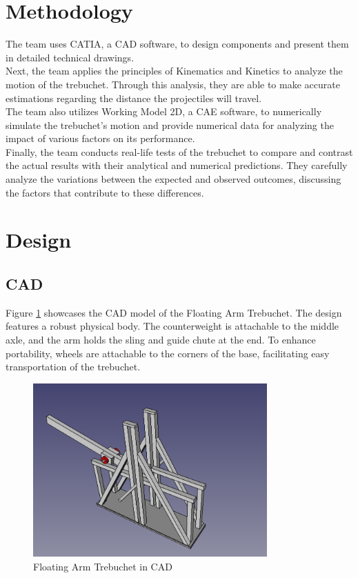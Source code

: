 \documentclass[12pt, titlepage]{article}
\begin{document}
    \section{Methodology}
    The team uses CATIA, a CAD software, to design components and present
    them in detailed technical drawings.\\[10pt] 
    Next, the team applies the principles of Kinematics and Kinetics to analyze the motion of the trebuchet. 
    Through this analysis, they are able to make accurate estimations regarding the distance the projectiles will travel.\\[10pt]
    The team also utilizes Working Model 2D, a CAE software, to numerically simulate the trebuchet's motion and provide numerical data for analyzing the impact of various factors on its performance.\\[10pt]
    Finally, the team conducts real-life tests of the trebuchet to compare and contrast the actual results with their analytical and numerical predictions. They carefully analyze the variations between the expected and observed outcomes, discussing the factors that contribute to these differences.    
    \newpage
    \section{Design}
    \subsection{CAD}
    Figure \ref{CAD} showcases the CAD model of the Floating Arm Trebuchet. The design features a robust physical body. The counterweight is attachable to the middle axle, and the arm holds the sling and guide chute at the end. To enhance portability, wheels are attachable to the corners of the base, facilitating easy transportation of the trebuchet.\\
    \begin{figure}[t]                                  
    \centering
    \includegraphics[width=0.8\textwidth]{figures/CAD.png}
    \caption{Floating Arm Trebuchet in CAD\label{CAD}}
    \end{figure}
    \newpage
\end{document}
